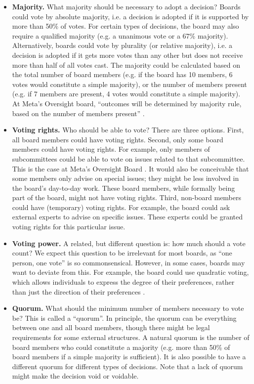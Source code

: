 \documentclass{article}
\begin{document}
\begin{itemize}[leftmargin=2em]
    \item \textbf{Majority.} What majority should be necessary to adopt a decision? Boards could vote by absolute majority, i.e. a decision is adopted if it is supported by more than 50\% of votes. For certain types of decisions, the board may also require a qualified majority (e.g. a unanimous vote or a 67\% majority). Alternatively, boards could vote by plurality (or relative majority), i.e. a decision is adopted if it gets more votes than any other but does not receive more than half of all votes cast. The majority could be calculated based on the total number of board members (e.g. if the board has 10 members, 6 votes would constitute a simple majority), or the number of members present (e.g. if 7 members are present, 4 votes would constitute a simple majority). At Meta’s Oversight board, “outcomes will be determined by majority rule, based on the number of members present” \cite{oversight2022bylaws}.
    \item \textbf{Voting rights.} Who should be able to vote? There are three options. First, all board members could have voting rights. Second, only some board members could have voting rights. For example, only members of subcommittees could be able to vote on issues related to that subcommittee. This is the case at Meta’s Oversight Board \cite{oversight2022bylaws}. It would also be conceivable that some members only advise on special issues; they might be less involved in the board’s day-to-day work. These board members, while formally being part of the board, might not have voting rights. Third, non-board members could have (temporary) voting rights. For example, the board could ask external experts to advise on specific issues. These experts could be granted voting rights for this particular issue.
    \item \textbf{Voting power.} A related, but different question is: how much should a vote count? We expect this question to be irrelevant for most boards, as “one person, one vote” is so commonsensical. However, in some cases, boards may want to deviate from this. For example, the board could use quadratic voting, which allows individuals to express the degree of their preferences, rather than just the direction of their preferences \cite{posner2014quadratic, lalley2018quadratic}.
    \item \textbf{Quorum.} What should the minimum number of members necessary to vote be? This is called a “quorum”. In principle, the quorum can be everything between one and all board members, though there might be legal requirements for some external structures. A natural quorum is the number of board members who could constitute a majority (e.g. more than 50\% of board members if a simple majority is sufficient). It is also possible to have a different quorum for different types of decisions. Note that a lack of quorum might make the decision void or voidable.

\end{itemize}
\end{document}
